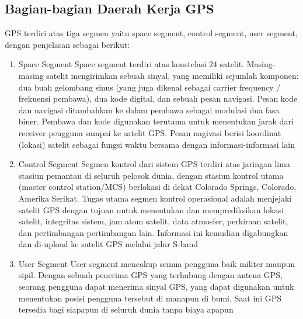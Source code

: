 \subsection{Bagian-bagian Daerah Kerja GPS }
GPS terdiri atas tiga segmen yaitu space segment, control segment, user segment, dengan penjelasan sebagai berikut: 
\begin{enumerate}
	\item Space Segment Space segment terdiri atas konstelasi 24 satelit. Masing-masing satelit mengirimkan sebuah sinyal, yang memiliki sejumlah komponen: dua buah gelombang sinus (yang juga dikenal sebagai carrier frequency / frekuensi pembawa), dua kode digital, dan sebuah pesan navigasi. Pesan kode dan navigasi ditambahkan ke dalam pembawa sebagai modulasi dua fasa biner. Pembawa dan kode digunakan terutama untuk menentukan jarak dari receiver pengguna sampai ke satelit GPS. Pesan nagivasi berisi koordinat (lokasi) satelit sebagai fungsi waktu bersama dengan informasi-informasi lain
	\item Control Segment Segmen kontrol dari sistem GPS terdiri atas jaringan lima stasiun pemantau di seluruh pelosok dunia, dengan stasiun kontrol utama (master control station/MCS) berlokasi di dekat Colorado Springs, Colorado, Amerika Serikat. Tugas utama segmen kontrol operasional adalah menjejaki satelit GPS dengan tujuan untuk menentukan dan memprediksikan lokasi satelit, integritas sistem, jam atom satelit, data atmosfer, perkiraan satelit, dan pertimbangan-pertimbangan lain. Informasi ini kemudian digabungkan dan di-upload ke satelit GPS melalui jalur S-band
	\item User Segment User segment mencakup semua pengguna baik militer maupun sipil. Dengan sebuah penerima GPS yang terhubung dengan antena GPS, seorang pengguna dapat menerima sinyal GPS, yang dapat digunakan untuk menentukan posisi pengguna tersebut di manapun di bumi. Saat ini GPS tersedia bagi siapapun di seluruh dunia tanpa biaya apapun
\end{enumerate}

